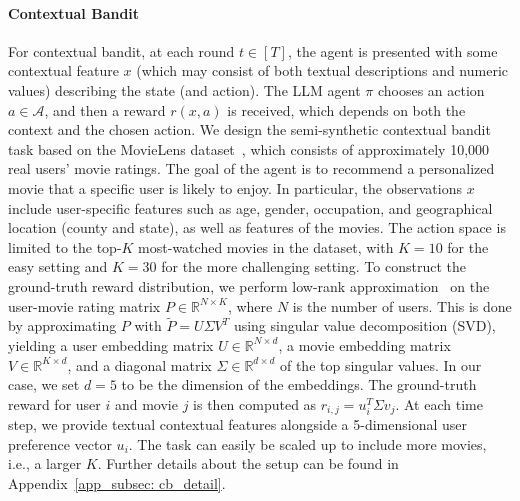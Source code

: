 \documentclass[11pt, logo]{googledeepmind}
\def\gA{{\mathcal{A}}}
\theoremstyle{plain}
\theoremstyle{definition}
\begin{document}
\paragraph{Contextual Bandit}
For contextual bandit, at each round $t\in[T]$, the agent is presented with some contextual feature $x$ (which may consist of both textual descriptions and numeric values) describing the state (and action). The LLM agent $\pi$ chooses an action $a \in \gA$, and then a reward $r(x, a)$ is received, which depends on both the context and the chosen action.
We design the semi-synthetic contextual bandit task based on the MovieLens dataset~\citep{harper2015movielens}, which consists of approximately 10,000 real users' movie ratings.
The goal of the agent is to recommend a personalized movie that a specific user is likely to enjoy.
In particular, the observations $x$ include user-specific features such as age, gender, occupation, and geographical location (county and state), as well as features of the movies. The action space is limited to the top-$K$ most-watched movies in the dataset, with $K=10$ for the easy setting and $K=30$ for the more challenging setting. To construct the ground-truth reward distribution, we perform low-rank approximation~\citep{koren2009matrix} on the user-movie rating matrix $P \in \mathbb{R}^{N \times K}$, where $N$ is the number of users.
This is done by approximating $P$ with $\tilde{P} = U \Sigma V^T$ using singular value decomposition (SVD), yielding a user embedding matrix $U \in \mathbb{R}^{N \times d}$, a movie embedding matrix $V \in \mathbb{R}^{K \times d}$, and a diagonal matrix $\Sigma \in \mathbb{R}^{d \times d}$ of the top singular values. In our case, we set $d=5$ to be the dimension of the embeddings. The ground-truth reward for user $i$ and movie $j$ is then computed as $r_{i,j} = u_i^T \Sigma v_j$.
At each time step, we provide textual contextual features alongside a 5-dimensional user preference vector $u_i$.
The task can easily be scaled up to include more movies, i.e., a larger $K$.
Further details about the setup can be found in Appendix~\ref{app_subsec: cb_detail}.
\end{document}
